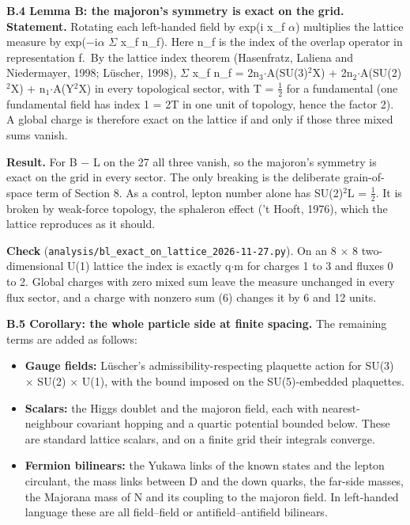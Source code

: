 \documentclass[
  11pt,
]{article}
\providecommand{\tightlist}{%
  \setlength{\itemsep}{0pt}\setlength{\parskip}{0pt}}
\begin{document}
\textbf{B.4 Lemma B: the majoron's symmetry is exact on the grid.} \textbf{Statement.} Rotating each left-handed field by exp(i x\_f \ensuremath{\alpha}) multiplies the lattice measure by exp(\ensuremath{-}i\ensuremath{\alpha} \ensuremath{\Sigma} x\_f n\_f). Here n\_f is the index of the overlap operator in representation f.~By the lattice index theorem (Hasenfratz, Laliena and Niedermayer, 1998; Lüscher, 1998), \ensuremath{\Sigma} x\_f n\_f = 2n\ensuremath{_{3}}\ensuremath{\cdot}A(SU(3)\ensuremath{^{2}}X) + 2n\ensuremath{_{2}}\ensuremath{\cdot}A(SU(2)\ensuremath{^{2}}X) + n\ensuremath{_{1}}\ensuremath{\cdot}A(Y\ensuremath{^{2}}X) in every topological sector, with T = \ensuremath{\frac{1}{2}} for a fundamental (one fundamental field has index 1 = 2T in one unit of topology, hence the factor 2). A global charge is therefore exact on the lattice if and only if those three mixed sums vanish.

\textbf{Result.} For B \ensuremath{-} L on the 27 all three vanish, so the majoron's symmetry is exact on the grid in every sector. The only breaking is the deliberate grain-of-space term of Section 8. As a control, lepton number alone has SU(2)\ensuremath{^{2}}L = \ensuremath{\frac{1}{2}}. It is broken by weak-force topology, the sphaleron effect ('t Hooft, 1976), which the lattice reproduces as it should.

\textbf{Check} (\texttt{analysis/bl\_exact\_on\_lattice\_2026-11-27.py}). On an 8 \ensuremath{\times} 8 two-dimensional U(1) lattice the index is exactly q\ensuremath{\cdot}m for charges 1 to 3 and fluxes 0 to 2. Global charges with zero mixed sum leave the measure unchanged in every flux sector, and a charge with nonzero sum (6) changes it by 6 and 12 units.

\textbf{B.5 Corollary: the whole particle side at finite spacing.} The remaining terms are added as follows:

\begin{itemize}
\tightlist
\item
  \textbf{Gauge fields:} Lüscher's admissibility-respecting plaquette action for SU(3) \ensuremath{\times} SU(2) \ensuremath{\times} U(1), with the bound imposed on the SU(5)-embedded plaquettes.
\item
  \textbf{Scalars:} the Higgs doublet and the majoron field, each with nearest-neighbour covariant hopping and a quartic potential bounded below. These are standard lattice scalars, and on a finite grid their integrals converge.
\item
  \textbf{Fermion bilinears:} the Yukawa links of the known states and the lepton circulant, the mass links between D and the down quarks, the far-side masses, the Majorana mass of N and its coupling to the majoron field. In left-handed language these are all field--field or antifield--antifield bilinears.
\end{itemize}
\end{document}
